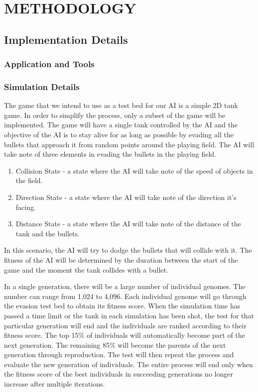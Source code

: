 \chapter{METHODOLOGY}
%
%
\section{Implementation Details}

\subsection{Application and Tools}


\subsection{Simulation Details}
The game that we intend to use as a test bed for our AI is a simple 2D tank game.
In order to simplify the process, only a subset of the game will be implemented.
The game will have a single tank controlled by the AI and the objective of the AI
is to stay alive for as long as possible by evading all the bullets that approach
it from random points around the playing field. The AI will take note of three
elements in evading the bullets in the playing field.

\begin{enumerate}
 \item Collision State - a state where the AI will take note of the speed 
of objects in the field.
 \item Direction State - a state where the AI will take note 
of the direction it's facing.
 \item Distance State - a state where the AI will
take note of the distance of the tank and the bullets.
\end{enumerate}

In this scenario, the AI will try to dodge the bullets that will collide with
it. The fitness of the AI will be determined by the duration between the start of
the game and the moment the tank collides with a bullet.


In a single generation, there will be a large number of individual genomes. The number
can range from 1,024 to 4,096. Each individual genome will go through the evasion
test bed to obtain its fitness score.  When the simulation time has passed a time 
limit or the tank in each simulation has been shot, the test for that 
particular generation will end and the individuals are ranked according to their fitness
score. The top 15\% of individuals will automatically become part of the next
generation. The remaining 85\% will become the parents of the next generation 
through reproduction. The test will then repeat the process and evaluate the new
generation of individuals. The entire process will end only when the fitness score
of the best individuals in succeeding generations no longer increase after multiple iterations.



